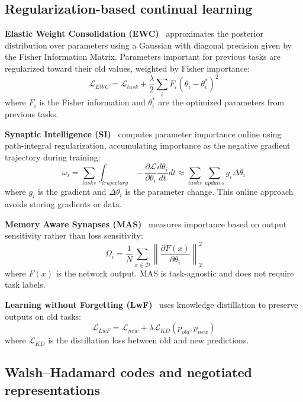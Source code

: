 \documentclass[preprint,review,12pt]{elsarticle}
\begin{document}
\subsection{Regularization-based continual learning}

\textbf{Elastic Weight Consolidation (EWC)}~\cite{kirkpatrick2017overcoming} approximates the posterior distribution over parameters using a Gaussian with diagonal precision given by the Fisher Information Matrix. Parameters important for previous tasks are regularized toward their old values, weighted by Fisher importance:
\begin{equation}
\mathcal{L}_{EWC} = \mathcal{L}_{task} + \frac{\lambda}{2} \sum_i F_i (\theta_i - \theta^*_i)^2
\end{equation}
where $F_i$ is the Fisher information and $\theta^*_i$ are the optimized parameters from previous tasks.

\textbf{Synaptic Intelligence (SI)}~\cite{zenke2017continual} computes parameter importance online using path-integral regularization, accumulating importance as the negative gradient trajectory during training:
\begin{equation}
\omega_i = \sum_{tasks} \int_{trajectory} -\frac{\partial \mathcal{L}}{\partial \theta_i} \frac{d\theta_i}{dt} dt \approx \sum_{tasks} \sum_{updates} g_i \Delta\theta_i
\end{equation}
where $g_i$ is the gradient and $\Delta\theta_i$ is the parameter change. This online approach avoids storing gradients or data.

\textbf{Memory Aware Synapses (MAS)}~\cite{aljundi2018memory} measures importance based on output sensitivity rather than loss sensitivity:
\begin{equation}
\Omega_i = \frac{1}{N} \sum_{x \in \mathcal{D}} \left\| \frac{\partial F(x)}{\partial \theta_i} \right\|_2^2
\end{equation}
where $F(x)$ is the network output. MAS is task-agnostic and does not require task labels.

\textbf{Learning without Forgetting (LwF)}~\cite{li2017learning} uses knowledge distillation to preserve outputs on old tasks:
\begin{equation}
\mathcal{L}_{LwF} = \mathcal{L}_{new} + \lambda \mathcal{L}_{KD}(p_{old}, p_{new})
\end{equation}
where $\mathcal{L}_{KD}$ is the distillation loss between old and new predictions.

\subsection{Walsh--Hadamard codes and negotiated representations}
\end{document}

